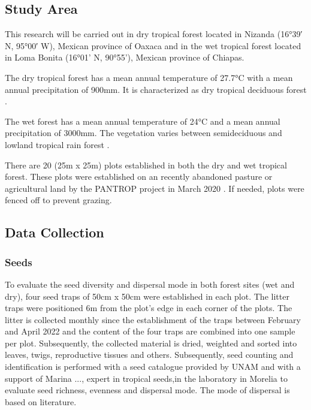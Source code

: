 

\subsection{Study Area}
This research will be carried out in dry tropical forest located in Nizanda (16°39′ N, 95°00′ W), Mexican province of Oaxaca and in the wet tropical forest located in Loma Bonita (16°01’ N, 90°55’), Mexican province of Chiapas. 

The dry tropical forest has a mean annual temperature of 27.7°C with a mean annual precipitation of 900mm. It is characterized as dry tropical deciduous forest \citep{hordijkLandUseHistory2024}. 

The wet forest has a mean annual temperature of 24°C and a mean annual precipitation of 3000mm. The vegetation varies between semideciduous and lowland tropical rain forest \citep{hordijkLandUseHistory2024}.

There are 20 (25m x 25m) plots established in both the dry and wet tropical forest. These plots were established on an recently abandoned pasture or agricultural land by the PANTROP project in March 2020 \citep{hordijkLandUseHistory2024}. If needed, plots were fenced off to prevent grazing. 


\subsection{Data Collection}

\subsubsection{Seeds}
To evaluate the seed diversity and dispersal mode in both forest sites (wet and dry), four seed traps of 50cm x 50cm were established in each plot. The litter traps were positioned 6m from the plot's edge in each corner of the plots. The litter is collected monthly since the establishment of the traps between February and April 2022 and the content of the four traps are combined into one sample per plot. 
Subsequently, the collected material is dried, weighted and sorted into leaves, twigs, reproductive tissues and others. Subsequently, seed counting and identification is performed with a seed catalogue provided by UNAM and with a support of Marina ..., expert in tropical seeds,in the laboratory in Morelia to evaluate seed richness, evenness and dispersal mode. The mode of dispersal is based on literature.

